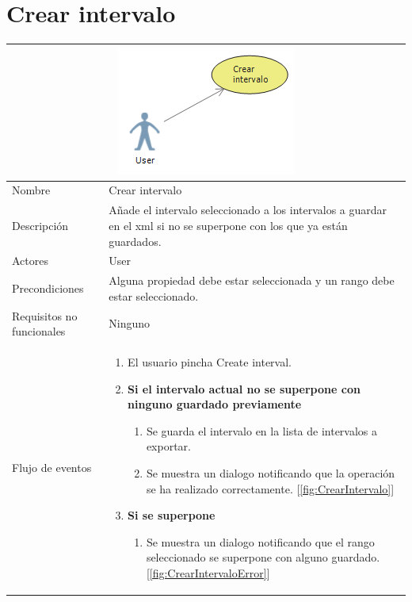 \clearpage

\section{Crear intervalo}
\begin{table}[H]
	\begin{center}
		\begin{tabular}{|l*{1}{p{10cm}}|}
			
			\multicolumn{2}{c}{\includegraphics[width=0.4\linewidth]{./Figures/CrearIntervalo.png}} \\
			\hline
		    Nombre                     & Crear intervalo \\
		    Descripci\'on              & A\~nade el intervalo seleccionado
		    							 a los intervalos a guardar en el xml si
		    							 no se superpone con los que ya est\'an guardados.\\ 
		    Actores                    & User  \\
		    Precondiciones             & Alguna propiedad debe estar seleccionada
		    							 y un rango debe estar seleccionado.  \\
		    Requisitos no funcionales  & Ninguno  \\
		    Flujo de eventos           & \begin{enumerate}
		    								\item El usuario pincha Create interval.
		    								\item \textbf{Si el intervalo actual
		    								no se superpone con ninguno
		    								guardado previamente}
		    								\begin{enumerate}
		    									\item Se guarda el intervalo en la lista
		    									de intervalos a exportar.
		    									\item Se muestra un dialogo notificando que
		    									la operaci\'on se ha realizado correctamente. [\ref{fig:CrearIntervalo}]
		    								\end{enumerate}
		    								\item \textbf{Si se superpone}
		    								\begin{enumerate}
			    								\item Se muestra un dialogo notificando que
		    									el rango seleccionado se superpone con alguno
		    									guardado. [\ref{fig:CrearIntervaloError}]
		    								\end{enumerate}
		    								

\end{enumerate}
\end{tabular}
\end{center}
\end{table}
